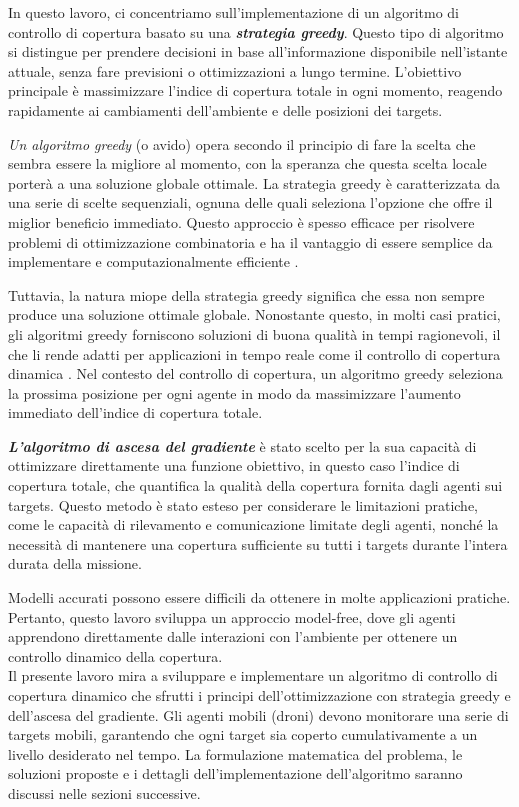 \documentclass[twoside]{article}
\begin{document}
\vspace{\baselineskip}

In questo lavoro, ci concentriamo sull'implementazione di un algoritmo di controllo di copertura basato su una \textit{\textbf{strategia greedy}}. Questo tipo di algoritmo si distingue per prendere decisioni in base all'informazione disponibile nell'istante attuale, senza fare previsioni o ottimizzazioni a lungo termine. L'obiettivo principale è massimizzare l'indice di copertura totale in ogni momento, reagendo rapidamente ai cambiamenti dell'ambiente e delle posizioni dei targets.

\textit{Un algoritmo greedy} (o avido) opera secondo il principio di fare la scelta che sembra essere la migliore al momento, con la speranza che questa scelta locale porterà a una soluzione globale ottimale. La strategia greedy è caratterizzata da una serie di scelte sequenziali, ognuna delle quali seleziona l'opzione che offre il miglior beneficio immediato. Questo approccio è spesso efficace per risolvere problemi di ottimizzazione combinatoria e ha il vantaggio di essere semplice da implementare e computazionalmente efficiente \cite{Cormen2009}.

Tuttavia, la natura miope della strategia greedy significa che essa non sempre produce una soluzione ottimale globale. Nonostante questo, in molti casi pratici, gli algoritmi greedy forniscono soluzioni di buona qualità in tempi ragionevoli, il che li rende adatti per applicazioni in tempo reale come il controllo di copertura dinamica \cite{Kleinberg2006}. Nel contesto del controllo di copertura, un algoritmo greedy seleziona la prossima posizione per ogni agente in modo da massimizzare l'aumento immediato dell'indice di copertura totale.

\textit{\textbf{L'algoritmo di ascesa del gradiente}} è stato scelto per la sua capacità di ottimizzare direttamente una funzione obiettivo, in questo caso l'indice di copertura totale, che quantifica la qualità della copertura fornita dagli agenti sui targets. Questo metodo è stato esteso per considerare le limitazioni pratiche, come le capacità di rilevamento e comunicazione limitate degli agenti, nonché la necessità di mantenere una copertura sufficiente su tutti i targets durante l'intera durata della missione.

\vspace{\baselineskip}

Modelli accurati possono essere difficili da ottenere in molte applicazioni pratiche. Pertanto, questo lavoro sviluppa un approccio model-free, dove gli agenti apprendono direttamente dalle interazioni con l'ambiente per ottenere un controllo dinamico della copertura.\\
Il presente lavoro mira a sviluppare e implementare un algoritmo di controllo di copertura dinamico che sfrutti i principi dell'ottimizzazione con strategia greedy e dell'ascesa del gradiente. Gli agenti mobili (droni) devono monitorare una serie di targets mobili, garantendo che ogni target sia coperto cumulativamente a un livello desiderato nel tempo. La formulazione matematica del problema, le soluzioni proposte e i dettagli dell'implementazione dell'algoritmo saranno discussi nelle sezioni successive.
\end{document}
